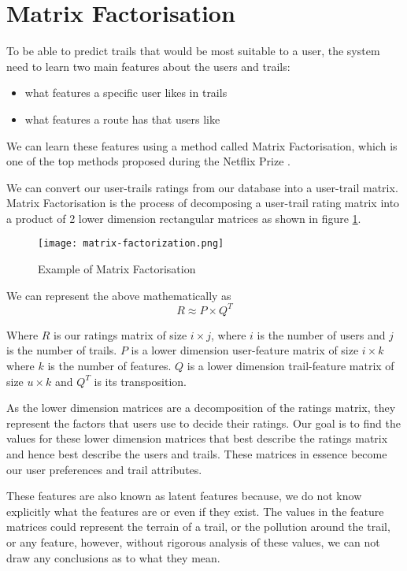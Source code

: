 \section{Matrix Factorisation} \label{matrixFactorization}
To be able to predict trails that would be most suitable to a user, the system need to learn two main features about the users and trails:
\begin{itemize}
    \item what features a specific user likes in trails
    \item what features a route has that users like
\end{itemize}
We can learn these features using a method called Matrix Factorisation, which is one of the top methods proposed during the Netflix Prize \cite{bell2007lessons}.

We can convert our user-trails ratings from our database into a user-trail matrix. Matrix Factorisation is the process of decomposing a user-trail rating matrix into a product of 2 lower dimension rectangular matrices \cite{koren2009bellkor} as shown in figure \ref{fig:matrixFactorization}.

\begin{figure}[ht]
    \centering
    \texttt{[image: matrix-factorization.png]}
    \caption{Example of Matrix Factorisation}
    \label{fig:matrixFactorization}
\end{figure}

We can represent the above mathematically as 
\begin{equation}
    R \approx P \times Q^T
\end{equation}

Where $R$ is our ratings matrix of size $i \times j$, where $i$ is the number of users and $j$ is the number of trails. $P$ is a lower dimension user-feature matrix of size $i \times k$ where $k$ is the number of features. $Q$ is a lower dimension trail-feature matrix of size $u \times k$ and $Q^T$ is its transposition.

As the lower dimension matrices are a decomposition of the ratings matrix, they represent the factors that users use to decide their ratings. Our goal is to find the values for these lower dimension matrices that best describe the ratings matrix and hence best describe the users and trails. These matrices in essence become our user preferences and trail attributes.

These features are also known as \Gls{latent} features because, we do not know explicitly what the features are or even if they exist. The values in the feature matrices could represent the terrain of a trail, or the pollution around the trail, or any feature, however, without rigorous analysis of these values, we can not draw any conclusions as to what they mean.

